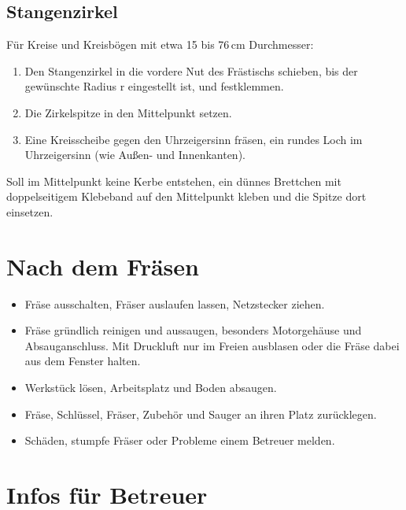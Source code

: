 \documentclass{\basedir/fablab-document}
\begin{document}
	\subsection{Stangenzirkel}
	Für Kreise und Kreisbögen mit etwa 15 bis 76\,cm Durchmesser:
	\begin{enumerate}
		\item Den Stangenzirkel in die vordere Nut des Frästischs schieben, bis der gewünschte Radius r eingestellt ist, und festklemmen.
		\item Die Zirkelspitze in den Mittelpunkt setzen.
		\item Eine Kreisscheibe gegen den Uhrzeigersinn fräsen, ein rundes Loch im Uhrzeigersinn (wie Außen- und Innenkanten).
	\end{enumerate}
	Soll im Mittelpunkt keine Kerbe entstehen, ein dünnes Brettchen mit doppelseitigem Klebeband auf den Mittelpunkt kleben und die Spitze dort einsetzen.

	\section{Nach dem Fräsen}

	\begin{itemize}
		\item Fräse ausschalten, Fräser auslaufen lassen, Netzstecker ziehen.
		\item Fräse gründlich reinigen und aussaugen, besonders Motorgehäuse und Absauganschluss. Mit Druckluft nur im Freien ausblasen oder die Fräse dabei aus dem Fenster halten.
		\item Werkstück lösen, Arbeitsplatz und Boden absaugen.
		\item Fräse, Schlüssel, Fräser, Zubehör und Sauger an ihren Platz zurücklegen.
		\item Schäden, stumpfe Fräser oder Probleme einem Betreuer melden.
	\end{itemize}

	\section{Infos für Betreuer}
\end{document}
